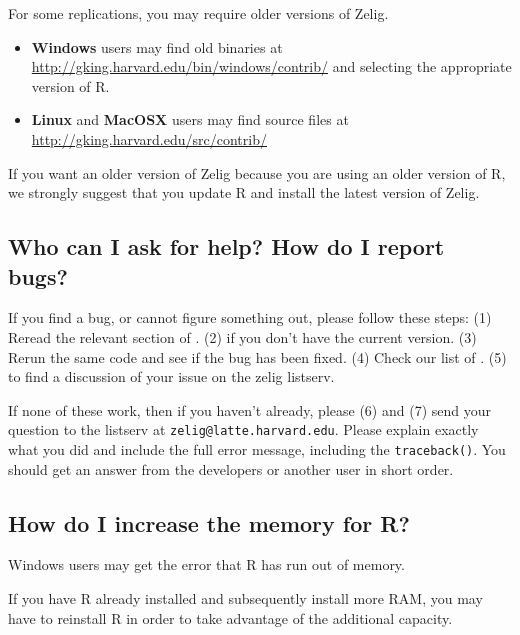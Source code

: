For some replications, you may require older versions of Zelig. 
\begin{itemize}
\item {\bf Windows} users may find old binaries at
\url{http://gking.harvard.edu/bin/windows/contrib/}
and selecting the appropriate version of R.

\item {\bf Linux} and {\bf MacOSX} users may find source files at
\url{http://gking.harvard.edu/src/contrib/} 
\end{itemize}  
If you want an older version of Zelig because you are using an older
version of R, we strongly suggest that you update R and install the
latest version of Zelig.  

\subsection*{Who can I ask for help?  How do I report bugs?}

If you find a bug, or cannot figure something out, please follow these
steps: (1) Reread the relevant section of .  (2)
 if you
don't have the current version.  (3) Rerun the same code and see if
the bug has been fixed.  (4) Check our list
of .
(5)  to find a
discussion of your issue on the zelig listserv.

If none of these work, then if you haven't already, please (6)
 and
(7) send your question to the listserv at
\texttt{zelig@latte.harvard.edu}.  Please explain exactly what you did
and include the full error message, including the {\tt traceback()}.
You should get an answer from the developers or another user in short
order.

\subsection*{How do I increase the memory for R?}

Windows users may get the error that R has run out of memory.  

If you have R already installed and subsequently install more RAM, you
may have to reinstall R in order to take advantage of the additional
capacity.

